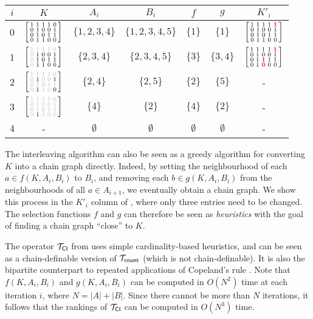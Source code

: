 \begin{table}
	\def\es{\emptyset}

	\begin{tabular}{ccccccc}
\toprule
$i$ & $K$        & $A_i$         & $B_i$           & $f$         & $g$       & $K'_i$    \\
\midrule
$0$ & $\left[ \begin{smallmatrix} 1 & 1 & 1 & 1 & 0 \\ 0 & 1 & 0 & 0 & 1 \\ 0 & 1 & 0 & 1 & 1 \\ 0 & 1 & 1 & 0 & 0 \\ \end{smallmatrix} \right]$   & $\{1,2,3,4\}$ & $\{1,2,3,4,5\}$ & $\{1\}$     & $\{1\}$   & $\left[ \begin{smallmatrix} 1 & 1 & 1 & 1 & \bm{{\color{red}1}} \\ 0 & 1 & 0 & 0 & 1 \\ 0 & 1 & 0 & 1 & 1 \\ 0 & 1 & 1 & 0 & 0 \\ \end{smallmatrix} \right]$ \\[2mm]
$1$ & $\kone$    & $\{2,3,4\}$   & $\{2,3,4,5\}$   & $\{3\}$     & $\{3,4\}$ & $\left[ \begin{smallmatrix} 1 & 1 & 1 & 1 & \bm{{\color{red}1}} \\ 0 & 1 & 0 & 0 & 1 \\ 0 & 1 & \bm{{\color{red}1}} & 1 & 1 \\ 0 & 1 & \bm{{\color{red}0}} & 0 & 0 \\ \end{smallmatrix} \right]$  \\[2mm]
$2$ & $\ktwo$    & $\{2,4\}$     & $\{2,5\}$       & $\{2\}$     & $\{5\}$   & -         \\[2mm]
$3$ & $\kthree$  & $\{4\}$       & $\{2\}$         & $\{4\}$     & $\{2\}$   & -         \\[2mm]
$4$ & -          & $\es$         & $\es$    	   & $\es$       & $\es$     & -         \\
\bottomrule
	\end{tabular}
    \label{tourn_tab_cardint_example}
\end{table}

The interleaving algorithm can also be seen as a greedy algorithm for
converting $K$ into a chain graph directly. Indeed, by setting the
neighbourhood of each $a \in f(K, A_i, B_i)$ to $B_i$, and removing each $b \in
g(K, A_i, B_i)$ from the neighbourhoods of all $a \in A_{i+1}$, we eventually
obtain a chain graph. We show this process in the $K'_i$ column of
, where only three entries need to be
changed.\footnotemark{} The selection functions $f$ and $g$ can therefore be
seen as \emph{heuristics} with the goal of finding a chain graph ``close'' to
$K$.


The operator ${\mathcal{T}_{\mathsf{CI}}}$ from  uses simple cardinality-based
heuristics, and can be seen as a chain-definable version of ${\mathcal{T}_{\mathsf{count}}}$ (which
is not chain-definable). It is also the bipartite counterpart to repeated
applications of Copeland's rule \cite{bouyssou2004monotonicity}. Note that
$f(K, A_i, B_i)$ and $g(K, A_i, B_i)$ can be computed in $O(N^2)$ time at each
iteration $i$, where $N = |A| + |B|$. Since there cannot be more than $N$
iterations, it follows that the rankings of ${\mathcal{T}_{\mathsf{CI}}}$ can be computed in
$O(N^3)$ time.

